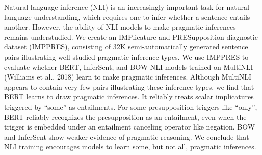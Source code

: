 Natural language inference (NLI) is an increasingly important task for natural language understanding, which requires one to infer whether a sentence entails another. However, the ability of NLI models to make pragmatic inferences remains understudied. We create an IMPlicature and PRESupposition diagnostic dataset (IMPPRES), consisting of 32K semi-automatically generated sentence pairs illustrating well-studied pragmatic inference types. We use IMPPRES to evaluate whether BERT, InferSent, and BOW NLI models trained on MultiNLI (Williams et al., 2018) learn to make pragmatic inferences. Although MultiNLI appears to contain very few pairs illustrating these inference types, we find that BERT learns to draw pragmatic inferences. It reliably treats scalar implicatures triggered by ``some'' as entailments. For some presupposition triggers like ``only'', BERT reliably recognizes the presupposition as an entailment, even when the trigger is embedded under an entailment canceling operator like negation. BOW and InferSent show weaker evidence of pragmatic reasoning. We conclude that NLI training encourages models to learn some, but not all, pragmatic inferences.
